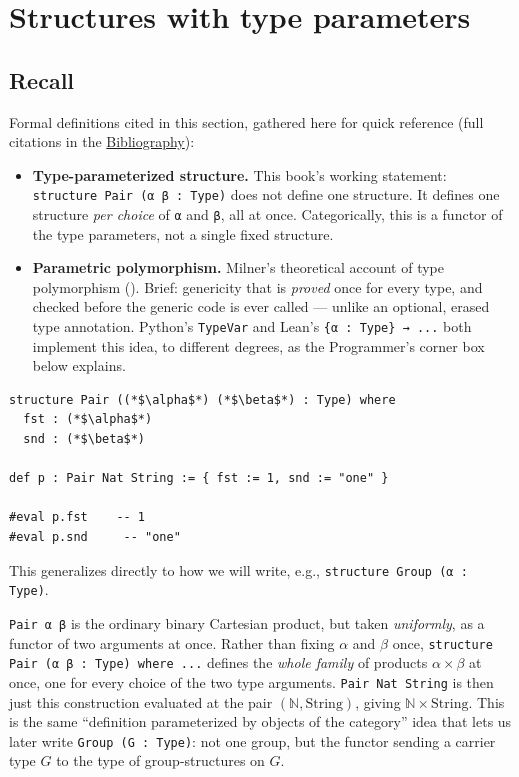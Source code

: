 \section{Structures with type parameters}\label{sec:02-functions-and-structures:02-type-parameters:1}

\subsection{Recall}\label{sec:02-functions-and-structures:02-type-parameters:2}

Formal definitions cited in this section, gathered here for quick reference (full citations in the \hyperref[sec:root:bibliography:1]{Bibliography}):

\begin{itemize}
\tightlist
\item
  \textbf{Type-parameterized structure.} This book's working statement: \texttt{structure Pair (α β : Type)} does not define one structure. It defines one structure \emph{per choice} of \texttt{α} and \texttt{β}, all at once. Categorically, this is a functor of the type parameters, not a single fixed structure.
\item
  \textbf{Parametric polymorphism.} Milner's theoretical account of type polymorphism (\cite{Milner1978}). Brief: genericity that is \emph{proved} once for every type, and checked before the generic code is ever called --- unlike an optional, erased type annotation. Python's \texttt{TypeVar} and Lean's \texttt{\{α : Type\} → ...} both implement this idea, to different degrees, as the Programmer's corner box below explains.
\end{itemize}

\begin{lstlisting}
structure Pair ((*$\alpha$*) (*$\beta$*) : Type) where
  fst : (*$\alpha$*)
  snd : (*$\beta$*)

def p : Pair Nat String := { fst := 1, snd := "one" }

#eval p.fst    -- 1
#eval p.snd     -- "one"
\end{lstlisting}

This generalizes directly to how we will write, e.g., \texttt{structure Group (α : Type)}.

\begin{mathreading}

\texttt{Pair α β} is the ordinary binary Cartesian product, but taken \emph{uniformly}, as a functor of two arguments at once. Rather than fixing \(\alpha\) and \(\beta\) once, \texttt{structure Pair (α β : Type) where ...} defines the \emph{whole family} of products \(\alpha \times \beta\) at once, one for every choice of the two type arguments. \texttt{Pair Nat String} is then just this construction evaluated at the pair \((\mathbb{N},
\mathrm{String})\), giving \(\mathbb{N} \times \mathrm{String}\). This is the same ``definition parameterized by objects of the category'' idea that lets us later write \texttt{Group (G : Type)}: not one group, but the functor sending a carrier type \(G\) to the type of group-structures on \(G\).

\end{mathreading}

